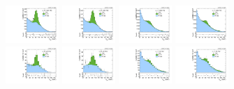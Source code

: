 \begin{figure}[htbp]
  \includegraphics[width=0.18\textwidth]{fig/fitValidation/PostFit_SR_MJJ__mu_HP_nobb_HDy_Run2.pdf}
  \includegraphics[width=0.18\textwidth]{fig/fitValidation/PostFit_SR_MJJ__e_HP_nobb_HDy_Run2.pdf}
  \includegraphics[width=0.18\textwidth]{fig/fitValidation/PostFit_SR_MJJ__mu_LP_nobb_HDy_Run2.pdf}
  \includegraphics[width=0.18\textwidth]{fig/fitValidation/PostFit_SR_MJJ__e_LP_nobb_HDy_Run2.pdf}\\
  \includegraphics[width=0.18\textwidth]{fig/fitValidation/PostFit_SR_MJJ__mu_HP_vbf_HDy_Run2.pdf}
  \includegraphics[width=0.18\textwidth]{fig/fitValidation/PostFit_SR_MJJ__e_HP_vbf_HDy_Run2.pdf}
  \includegraphics[width=0.18\textwidth]{fig/fitValidation/PostFit_SR_MJJ__mu_LP_vbf_HDy_Run2.pdf}
  \includegraphics[width=0.18\textwidth]{fig/fitValidation/PostFit_SR_MJJ__e_LP_vbf_HDy_Run2.pdf}\\
  \caption{
  }
  \label{fig:postfit_MJJ_Run2}
\end{figure}

